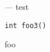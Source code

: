 \startmanpage
{}
--- test 
\startvb\begin{verbatim}
int foo3()

\end{verbatim}
\endvb

foo
\endmanpage
